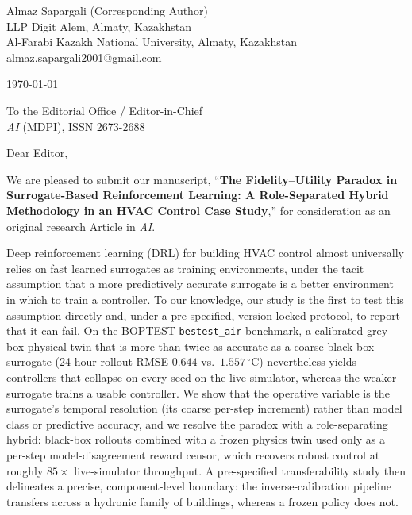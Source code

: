 \documentclass[11pt,a4paper]{article}
\begin{document}
\noindent
Almaz Sapargali (Corresponding Author)\\
LLP Digit Alem, Almaty, Kazakhstan\\
Al-Farabi Kazakh National University, Almaty, Kazakhstan\\
\href{mailto:almaz.sapargali2001@gmail.com}{almaz.sapargali2001@gmail.com}

\vspace{1em}
\noindent\today

\vspace{1em}
\noindent
To the Editorial Office / Editor-in-Chief\\
\textit{AI} (MDPI), ISSN 2673-2688

\vspace{1.2em}
\noindent Dear Editor,

\vspace{0.6em}
We are pleased to submit our manuscript, ``\textbf{The Fidelity--Utility Paradox
in Surrogate-Based Reinforcement Learning: A Role-Separated Hybrid Methodology in
an HVAC Control Case Study},'' for consideration as an original research Article in
\textit{AI}.

Deep reinforcement learning (DRL) for building HVAC control almost universally
relies on fast learned surrogates as training environments, under the tacit
assumption that a more predictively accurate surrogate is a better environment in
which to train a controller. To our knowledge, our study is the first to test
this assumption directly and, under a pre-specified, version-locked protocol, to report that it
can fail. On the BOPTEST \texttt{bestest\_air} benchmark, a calibrated grey-box
physical twin that is more than twice as accurate as a coarse black-box surrogate
(24-hour rollout RMSE $0.644$ vs.\ $1.557\,^{\circ}$C) nevertheless yields
controllers that collapse on every seed on the live simulator, whereas the weaker
surrogate trains a usable controller. We show that the operative variable is the
surrogate's temporal resolution (its coarse per-step increment) rather than
model class or predictive accuracy, and we resolve the paradox with a
role-separating hybrid: black-box rollouts combined with a frozen physics twin
used only as a per-step model-disagreement reward censor, which recovers robust
control at roughly $85\times$ live-simulator throughput. A pre-specified transferability
study then delineates a precise, component-level boundary: the inverse-calibration
pipeline transfers across a hydronic family of buildings, whereas a frozen policy
does not.
\end{document}
